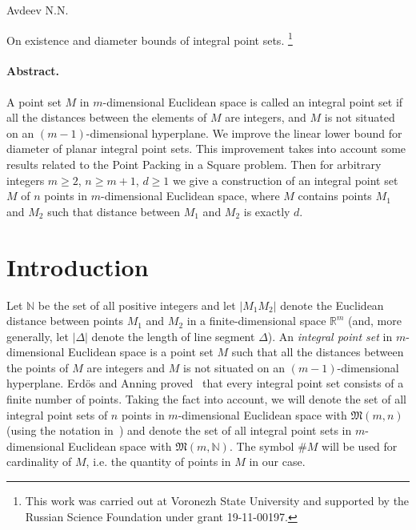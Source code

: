 \documentclass[a4paper,14pt]{article} %
\theoremstyle{plain}
\theoremstyle{definition}
\begin{document}

Avdeev N.N.

On existence and diameter bounds of integral point sets.
\footnote{
	This work was carried out at Voronezh State University and supported by the Russian Science
	Foundation under grant 19-11-00197.
}

\paragraph{Abstract.}
A point set $M$ in $m$-dimensional Euclidean space is called an integral point set if all the distances between the
elements of $M$ are integers, and $M$ is not situated on an $(m-1)$-dimensional hyperplane.
We improve the linear lower bound for diameter of planar integral point sets.
This improvement takes into account some results related to the Point Packing in a Square problem.
Then for arbitrary integers $m \geq 2$, $n \geq m+1$, $d \geq 1$
we give a construction of an integral point set $M$ of $n$ points in $m$-dimensional Euclidean space,
where $M$ contains points $M_1$ and $M_2$ such that distance between $M_1$ and $M_2$ is exactly $d$.



\section{Introduction}
Let $\mathbb{N}$ be the set of all positive integers and let $|M_1 M_2|$ denote the Euclidean distance
between points $M_1$ and $M_2$ in a finite-dimensional space $\mathbb{R}^m$
(and, more generally, let $|\Delta|$ denote the length of line segment $\Delta$).
An \textit{integral point set} in $m$-dimensional Euclidean space is a point set $M$ such that all the distances between the
points of $M$ are integers and $M$ is not situated on an $(m-1)$-dimensional hyperplane.
Erd\"os and Anning proved~\cite{anning1945integral,erdos1945integral} that every integral point set consists of a finite number of points.
Taking the fact into account, we will denote the set of all integral point sets of $n$ points in $m$-dimensional Euclidean space with
$\mathfrak{M}(m,n)$ (using the notation in~\cite{our-vmmsh-2018})
and denote the set of all integral point sets in $m$-dimensional Euclidean space with $\mathfrak{M}(m,\mathbb{N})$.
The symbol $\# M$ will be used for cardinality of $M$, i.e. the quantity of points in $M$ in our case.
\end{document}
